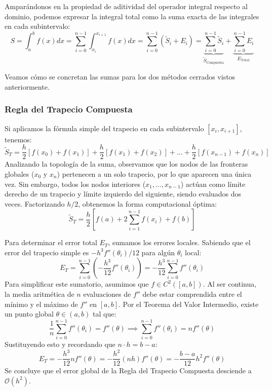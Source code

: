 Amparándonos en la propiedad de aditividad del operador integral respecto al dominio, podemos expresar la integral total como la suma exacta de las integrales en cada subintervalo:
\[
    S = \int_a^b f(x) dx = \sum_{i=0}^{n-1} \int_{x_i}^{x_{i+1}} f(x) dx = \sum_{i=0}^{n-1} \left( \widetilde{S}_i + E_i \right) = \underbrace{\sum_{i=0}^{n-1} \widetilde{S}_i}_{\widetilde{S}_{\text{Compuesta}}} + \underbrace{\sum_{i=0}^{n-1} E_i}_{E_{\text{Total}}}
\]

Veamos cómo se concretan las sumas para los dos métodos cerrados vistos anteriormente.

\subsubsection{Regla del Trapecio Compuesta}

Si aplicamos la fórmula simple del trapecio en cada subintervalo $[x_i, x_{i+1}]$, tenemos:
\[
    \widetilde{S}_T = \frac{h}{2} [f(x_0) + f(x_1)] + \frac{h}{2} [f(x_1) + f(x_2)] + \dots + \frac{h}{2} [f(x_{n-1}) + f(x_n)]
\]
Analizando la topología de la suma, observamos que los nodos de las fronteras globales ($x_0$ y $x_n$) pertenecen a un solo trapecio, por lo que aparecen una única vez. Sin embargo, todos los nodos interiores ($x_1, \dots, x_{n-1}$) actúan como límite derecho de un trapecio y límite izquierdo del siguiente, siendo evaluados dos veces. Factorizando $h/2$, obtenemos la forma computacional óptima:
\[
    \boxed{\widetilde{S}_T = \frac{h}{2} \left[ f(a) + 2 \sum_{i=1}^{n-1} f(x_i) + f(b) \right]}
\]

Para determinar el error total $E_T$, sumamos los errores locales. Sabiendo que el error del trapecio simple es $-h^3 f''(\theta_i) / 12$ para algún $\theta_i$ local:
\[
    E_T = \sum_{i=0}^{n-1} \left( -\frac{h^3}{12} f''(\theta_i) \right) = -\frac{h^3}{12} \sum_{i=0}^{n-1} f''(\theta_i)
\]
Para simplificar este sumatorio, asumimos que $f \in C^2([a,b])$. Al ser continua, la media aritmética de $n$ evaluaciones de $f''$ debe estar comprendida entre el mínimo y el máximo de $f''$ en $[a,b]$. Por el Teorema del Valor Intermedio, existe un punto global $\theta \in (a,b)$ tal que:
\[
    \frac{1}{n} \sum_{i=0}^{n-1} f''(\theta_i) = f''(\theta) \implies \sum_{i=0}^{n-1} f''(\theta_i) = n f''(\theta)
\]
Sustituyendo esto y recordando que $n \cdot h = b-a$:
\[
    E_T = -\frac{h^3}{12} n f''(\theta) = -\frac{h^2}{12} (n h) f''(\theta) = \boxed{-\frac{b-a}{12} h^2 f''(\theta)}
\]
Se concluye que el error global de la Regla del Trapecio Compuesta desciende a $\mathcal{O}(h^2)$.

